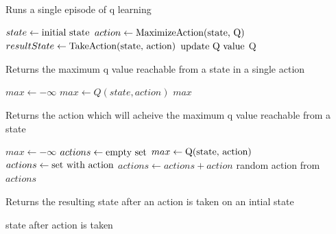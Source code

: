 \documentclass[times, 10pt,twocolumn]{article}
\begin{document}
\begin{algorithm}
  \caption{Runs a single episode of q learning}
  \begin{algorithmic}[3]
      \State $state\gets \textnormal{initial state}$
        \State $action\gets \textnormal{MaximizeAction(state, Q)}$
        \State $resultState\gets \textnormal{TakeAction(state, action)}$
        \State $\textnormal{update Q value}$
      \EndWhile
      \State \Return Q
    \EndFunction
  \end{algorithmic}
\end{algorithm}

\begin{algorithm}
  \caption{Returns the maximum q value reachable from a state in a single action}
  \begin{algorithmic}[4]
      \State $max\gets -\infty$
          \State $max\gets Q(state, action)$
        \EndIf
      \EndFor
      \State \Return $max$
    \EndFunction
  \end{algorithmic}
\end{algorithm}

\begin{algorithm}
  \caption{Returns the action which will acheive the maximum q value reachable from a state}
  \begin{algorithmic}[5]
      \State $max\gets -\infty$
      \State $actions\gets \textnormal{empty set}$
          \State $max\gets \textnormal{Q(state, action)}$
          \State $actions\gets \textnormal{set with action}$
        \Else
          \State $actions\gets actions + action$
        \EndIf
      \EndFor
      \State \Return random action from $actions$
    \EndFunction
  \end{algorithmic}
\end{algorithm}

\begin{algorithm}
  \caption{Returns the resulting state after an action is taken on an intial state}
  \begin{algorithmic}[6]
      \State \Return state after action is taken
    \EndFunction
  \end{algorithmic}
\end{algorithm}
\end{document}
